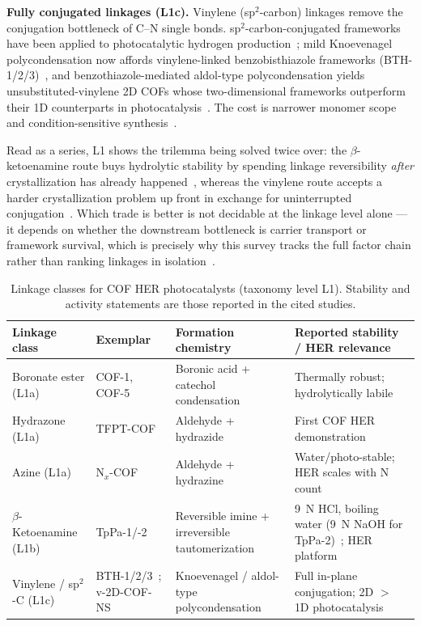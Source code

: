 \textbf{Fully conjugated linkages (L1c).} Vinylene (sp$^2$-carbon) linkages remove the
conjugation bottleneck of C--N single bonds. sp$^2$-carbon-conjugated frameworks have been
applied to photocatalytic hydrogen production~\cite{jin20192d}; mild Knoevenagel
polycondensation now affords vinylene-linked benzobisthiazole frameworks
(BTH-1/2/3)~\cite{wang2022facile}, and benzothiazole-mediated aldol-type polycondensation
yields unsubstituted-vinylene 2D COFs whose two-dimensional frameworks outperform their 1D
counterparts in photocatalysis~\cite{li2023two}. The cost is narrower monomer scope and
condition-sensitive synthesis~\cite{wang2022facile,li2023two}.

Read as a series, L1 shows the trilemma being solved twice over: the $\beta$-ketoenamine
route buys hydrolytic stability by spending linkage reversibility \emph{after} crystallization
has already happened~\cite{kandambeth2012construction}, whereas the vinylene route accepts a
harder crystallization problem up front in exchange for uninterrupted
conjugation~\cite{li2023two,haase2020solving}. Which trade is better is not decidable at the
linkage level alone --- it depends on whether the downstream bottleneck is carrier transport or
framework survival, which is precisely why this survey tracks the full factor chain rather
than ranking linkages in isolation~\cite{haase2020solving,zhang2022reconstructed}.

\begin{table}[t]
\centering
\caption{Linkage classes for COF HER photocatalysts (taxonomy level L1). Stability and
activity statements are those reported in the cited studies.}
\label{tab:linkage}
\footnotesize
\begin{tabular}{P{2.3cm}P{2.4cm}P{3.3cm}P{4.9cm}}
\toprule
Linkage class & Exemplar & Formation chemistry & Reported stability / HER relevance \\
\midrule
Boronate ester (L1a) & COF-1, COF-5~\cite{cote2005porous} & Boronic acid + catechol
condensation & Thermally robust; hydrolytically labile~\cite{cote2005porous,haase2020solving} \\
Hydrazone (L1a) & TFPT-COF~\cite{stegbauer2014a} & Aldehyde + hydrazide & First COF HER
demonstration~\cite{stegbauer2014a} \\
Azine (L1a) & N$_x$-COF~\cite{vyas2015a} & Aldehyde + hydrazine & Water/photo-stable; HER
scales with N count~\cite{vyas2015a} \\
$\beta$-Ketoenamine (L1b) & TpPa-1/-2~\cite{kandambeth2012construction} & Reversible imine +
irreversible tautomerization & 9~N HCl, boiling water (9~N NaOH for
TpPa-2)~\cite{kandambeth2012construction}; HER platform~\cite{pachfule2017diacetylene,sheng2019effect} \\
Vinylene / sp$^2$-C (L1c) & BTH-1/2/3~\cite{wang2022facile};
v-2D-COF-NS~\cite{li2023two} & Knoevenagel / aldol-type polycondensation & Full in-plane
conjugation; 2D $>$ 1D photocatalysis~\cite{li2023two} \\
\bottomrule
\end{tabular}
\end{table}

